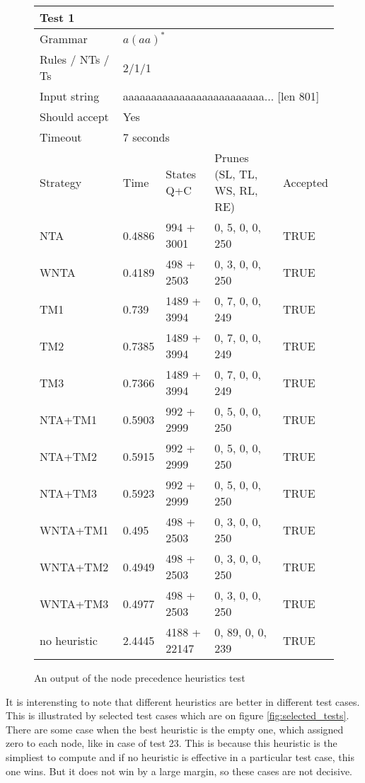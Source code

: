 \begin{figure}[h]
  \caption{An output of the node precedence heuristics test}
  \label{tab:node_heuristics_table}
\begin{tabular}{ |l|l|l|l|l|  }
  \hline
  \multicolumn{5}{|l|}{Test 1} \\
  \hline
  Grammar & \multicolumn{4}{|l|}{$a(aa)^*$} \\
  Rules / NTs / Ts & \multicolumn{4}{|l|}{2/1/1} \\
  Input string & \multicolumn{4}{|l|}{aaaaaaaaaaaaaaaaaaaaaaaaa... [len 801]} \\
  Should accept & \multicolumn{4}{|l|}{Yes} \\
  Timeout & \multicolumn{4}{|l|}{7 seconds} \\
  \hline
  Strategy & Time & States Q+C & Prunes (SL, TL, WS, RL, RE)& Accepted \\
  \hline
 NTA & 0.4886 & 994 + 3001  & 0, 5, 0, 0, 250 & TRUE \\
 WNTA & 0.4189 & 498 + 2503 & 0, 3, 0, 0, 250 & TRUE  \\
 TM1 & 0.739 & 1489 + 3994 & 0, 7, 0, 0, 249  & TRUE  \\
 TM2 & 0.7385 & 1489 + 3994 & 0, 7, 0, 0, 249 & TRUE  \\
 TM3 & 0.7366 & 1489 + 3994 & 0, 7, 0, 0, 249  & TRUE  \\
 NTA+TM1 & 0.5903 & 992 + 2999 & 0, 5, 0, 0, 250 & TRUE  \\
 NTA+TM2 & 0.5915 & 992 + 2999 & 0, 5, 0, 0, 250 & TRUE  \\
 NTA+TM3 & 0.5923 & 992 + 2999 & 0, 5, 0, 0, 250 & TRUE  \\
 WNTA+TM1 & 0.495 & 498 + 2503 & 0, 3, 0, 0, 250 & TRUE  \\
 WNTA+TM2 & 0.4949 & 498 + 2503 & 0, 3, 0, 0, 250 & TRUE  \\
 WNTA+TM3 & 0.4977 & 498 + 2503 & 0, 3, 0, 0, 250 & TRUE  \\
 no heuristic & 2.4445 & 4188 + 22147 & 0, 89, 0, 0, 239 & TRUE  \\
  \hline
  \hline
\end{tabular}
\end{figure}

It is interensting to note that different heuristics are better in different test cases. This is illustrated by selected test cases which are on figure \ref{fig:selected_tests}. There are some case when the best heuristic is the empty one, which assigned zero to each node, like in case of test 23. This is because this heuristic is the simpliest to compute and if no heuristic is effective in a particular test case, this one wins. But it does not win by a large margin, so these cases are not decisive.

